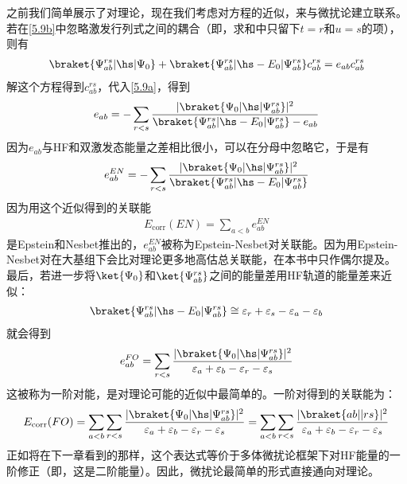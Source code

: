之前我们简单展示了对理论，现在我们考虑对方程的近似，来与微扰论建立联系。若在\autoref{5.9b}中忽略激发行列式之间的耦合（即，求和中只留下$t=r$和$u=s$的项），则有
\begin{align}
    \braket{\Psi^{rs}_{ab}|\hs|\Psi_0}+\braket{\Psi^{rs}_{ab}|\hs-E_0|\Psi^{rs}_{ab}}c^{rs}_{ab}=e_{ab}c^{rs}_{ab}
\end{align}
解这个方程得到$c^{rs}_{ab}$，代入\autoref{5.9a}，得到
\begin{align}
    e_{ab}=-\sum_{r<s}\frac{|\braket{\Psi_0|\hs|\Psi^{rs}_{ab}}|^2}{\braket{\Psi^{rs}_{ab}|\hs-E_0|\Psi^{rs}_{ab}}-e_{ab}}
\end{align}
因为$e_{ab}$与HF和双激发态能量之差相比很小，可以在分母中忽略它，于是有
\begin{align}
    e_{ab}^{EN}=-\sum_{r<s}\frac{|\braket{\Psi_0|\hs|\Psi^{rs}_{ab}}|^2}{\braket{\Psi^{rs}_{ab}|\hs-E_0|\Psi^{rs}_{ab}}}
\end{align}
因为用这个近似得到的关联能
\begin{align}
    E_\text{corr}(EN)=\sum_{a<b}e_{ab}^{EN}
\end{align}
是Epstein和Nesbet推出的，$e_{ab}^{EN}$被称为Epstein-Nesbet对关联能。因为用Epstein-Nesbet对在大基组下会比对理论更多地高估总关联能，在本书中只作偶尔提及。
最后，若进一步将$\ket{\Psi_0}$和$\ket{\Psi^{rs}_{ab}}$之间的能量差用HF轨道的能量差来近似：
\begin{align}
    \braket{\Psi^{rs}_{ab}|\hs-E_0|\Psi^{rs}_{ab}}\cong \varepsilon_r+\varepsilon_s-\varepsilon_a-\varepsilon_b
\end{align}
就会得到
\begin{align}
    e_{ab}^{FO}=\sum_{r<s}\frac{|\braket{\Psi_0|\hs|\Psi^{rs}_{ab}}|^2}{\varepsilon_a+\varepsilon_b-\varepsilon_r-\varepsilon_s}
\end{align}
这被称为一阶对能，是对理论可能的近似中最简单的。一阶对得到的关联能为：
\begin{align}
    \label{5.19}
    E_\text{corr}(FO)=\sum_{a<b}\sum_{r<s}\frac{|\braket{\Psi_0|\hs|\Psi^{rs}_{ab}}|^2}{\varepsilon_a+\varepsilon_b-\varepsilon_r-\varepsilon_s}
    =\sum_{a<b}\sum_{r<s}\frac{|\braket{ab||rs}|^2}{\varepsilon_a+\varepsilon_b-\varepsilon_r-\varepsilon_s}
\end{align}
正如将在下一章看到的那样，这个表达式等价于多体微扰论框架下对HF能量的一阶修正（即，这是二阶能量）。因此，微扰论最简单的形式直接通向对理论。
